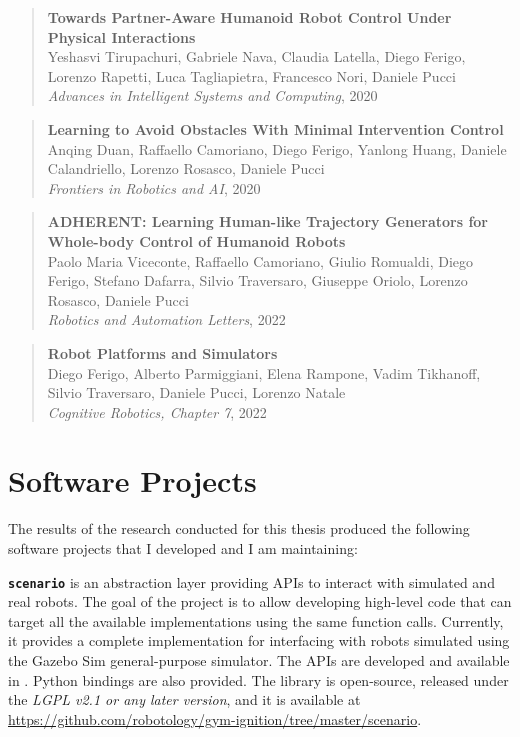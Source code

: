 \begin{quote}
    \textbf{Towards Partner-Aware Humanoid Robot Control Under Physical Interactions} \\
    Yeshasvi Tirupachuri, Gabriele Nava, Claudia Latella, Diego Ferigo, Lorenzo Rapetti, Luca Tagliapietra, Francesco Nori, Daniele Pucci \\
    \textit{Advances in Intelligent Systems and Computing}, 2020
\end{quote}

\begin{quote}
    \textbf{Learning to Avoid Obstacles With Minimal Intervention Control} \\
    Anqing Duan, Raffaello Camoriano, Diego Ferigo, Yanlong Huang, Daniele Calandriello, Lorenzo Rosasco, Daniele Pucci \\
    \textit{Frontiers in Robotics and AI}, 2020
\end{quote}

\begin{quote}
    \textbf{ADHERENT: Learning Human-like Trajectory Generators for Whole-body Control of Humanoid Robots} \\
    Paolo Maria Viceconte, Raffaello Camoriano, Giulio Romualdi, Diego Ferigo, Stefano Dafarra, Silvio Traversaro, Giuseppe Oriolo, Lorenzo Rosasco, Daniele Pucci \\
    \textit{Robotics and Automation Letters}, 2022
\end{quote}

\begin{quote}
    \textbf{Robot Platforms and Simulators} \\
    Diego Ferigo, Alberto Parmiggiani, Elena Rampone, Vadim Tikhanoff, Silvio Traversaro, Daniele Pucci, Lorenzo Natale \\
    \textit{Cognitive Robotics, Chapter 7}, 2022
\end{quote}

\newpage
\section*{Software Projects}

The results of the research conducted for this thesis produced the following software projects that I developed and I am maintaining:

\vspace{3mm}
\noindent
\textbf{\texttt{scenario}} is an abstraction layer providing \acp{API} to interact with simulated and real robots. The goal of the project is to allow developing high-level code that can target all the available implementations using the same function calls. Currently, it provides a complete implementation for interfacing with robots simulated using the Gazebo Sim general-purpose simulator. The \acp{API} are developed and available in \cpp. Python bindings are also provided. The library is open-source, released under the \emph{LGPL v2.1 or any later version}, and it is available at \linebreak \url{https://github.com/robotology/gym-ignition/tree/master/scenario}.

